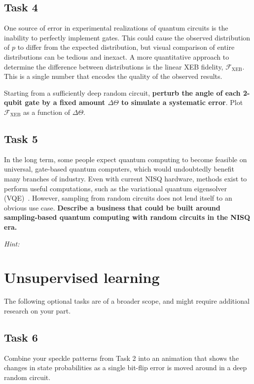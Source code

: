 \documentclass[12pt]{article}
\begin{document}
\subsection*{Task 4}

One source of error in experimental realizations of quantum circuits is the inability to perfectly implement gates.
This could cause the observed distribution of $p$ to differ from the expected distribution, but visual comparison of entire distributions can be tedious and inexact.
A more quantitative approach to determine the difference between distributions is the linear XEB fidelity, $\mathcal{F}_\mathrm{XEB}$.
This is a single number that encodes the quality of the observed results.

Starting from a sufficiently deep random circuit, \textbf{perturb the angle of each 2-qubit gate by a fixed amount $\Delta \Theta$ to simulate a systematic error}.
Plot $\mathcal{F}_\mathrm{XEB}$ as a function of $\Delta \Theta$.


\subsection*{Task 5}

In the long term, some people expect quantum computing to become feasible on universal, gate-based quantum computers, which would undoubtedly benefit many branches of industry.
Even with current NISQ hardware, methods exist to perform useful computations, such as the variational quantum eigensolver (VQE)~\cite{peruzzo2014variational}.
However, sampling from random circuits does not lend itself to an obvious use case.
\textbf{Describe a business that could be built around sampling-based quantum computing with random circuits in the NISQ era.}

\medskip \noindent \textit{Hint:} 


\section*{Unsupervised learning}

The following optional tasks are of a broader scope, and might require additional research on your part.


\subsection*{Task 6}

Combine your speckle patterns from Task 2 into an animation that shows the changes in state probabilities as a single bit-flip error is moved around in a deep random circuit.
\end{document}
